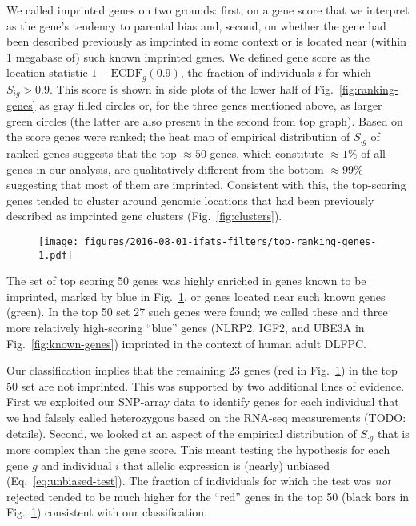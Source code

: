 \documentclass[letterpaper]{article}
\begin{document}
We called imprinted genes on two grounds: first, on a gene score that we
interpret as the gene's tendency to parental bias and, second, on whether the
gene had been described previously as imprinted in some context or is located near (within 1
megabase of) such known imprinted genes.  We defined gene score as the
location statistic \(1 - \mathrm{ECDF}_g(0.9)\), the fraction of individuals
\(i\) for which \(S_{ig}>0.9\).  This score is shown in side plots of the
lower half of Fig.~\ref{fig:ranking-genes} as gray filled circles or, for the
three genes mentioned above, as larger green circles (the latter are also
present in the second from top graph).  Based on the score genes were ranked;
the heat map of empirical distribution of \(S_{\cdot g}\) of ranked genes
suggests that the top \(\approx 50\) genes, which constitute \(\approx 1\%\)
of all genes in our analysis, are qualitatively different from the bottom
\(\approx 99\%\) suggesting that most of them are imprinted.  Consistent with
this, the top-scoring genes tended to cluster around genomic locations that
had been previously described as imprinted gene clusters
(Fig.~\ref{fig:clusters}).

\begin{figure}
\begin{center}
\texttt{[image: figures/2016-08-01-ifats-filters/top-ranking-genes-1.pdf]}
\caption{}
\label{fig:top-genes}
\end{center}
\end{figure}

The set of top scoring 50 genes was highly enriched in genes known to be
imprinted, marked by blue in Fig.~\ref{fig:top-genes}, or genes located near
such known genes (green).  In the top 50 set 27 such genes were found; we
called these and three more relatively high-scoring ``blue'' genes (NLRP2,
IGF2, and UBE3A in Fig.~\ref{fig:known-genes}) imprinted in the context of
human adult DLFPC.

Our classification implies that the remaining 23 genes (red in
Fig.~\ref{fig:top-genes}) in the top 50 set are not imprinted.  This was
supported by two additional lines of evidence.  First we exploited our
SNP-array data to identify genes for each individual that we had falsely
called heterozygous based on the RNA-seq measurements (TODO: details).
Second, we looked at an aspect of the empirical distribution of \(S_{\cdot
g}\) that is more complex than the gene score.  This meant testing the
hypothesis for each gene \(g\) and individual \(i\) that allelic expression is
(nearly) unbiased (Eq.~\ref{eq:unbiased-test}).  The fraction of individuals
for which the test was \emph{not} rejected tended to be much higher for the
``red'' genes in the top 50 (black bars in Fig.~\ref{fig:top-genes})
consistent with our classification.
\end{document}
